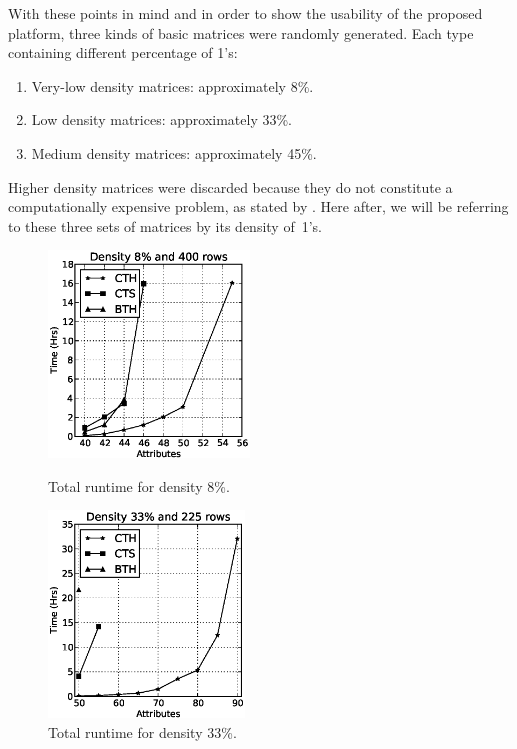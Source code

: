 \documentclass[authoryear,preprint,review,12pt]{elsarticle}
\begin{document}
With these points in mind and in order to show the usability of the proposed platform, 
three kinds of basic matrices were randomly generated. Each type containing different percentage of 1's: 
\begin{enumerate}
	\item Very-low density matrices: approximately 8\%.
	\item Low density matrices: approximately 33\%.
	\item Medium density matrices: approximately 45\%.
\end{enumerate}

Higher density matrices were discarded because they do not constitute a computationally expensive problem, 
as stated by \cite{R21}. Here after, we will be referring to these three sets of matrices by its 
density of~1's.

\begin{figure}[htb]
\centering
\begin{minipage}{.5\textwidth}
  \centering
   \includegraphics[width=\linewidth , height=5.5cm]{low_density.eps}
  \caption{Total runtime for density 8\%.}
  \label{fig:result1}
\end{minipage}%
\begin{minipage}{.5\textwidth}
  \centering
   \includegraphics[width=\linewidth , height=5.5cm]{med_density.eps}
  \caption{Total runtime for density 33\%.}
  \label{fig:result2}
\end{minipage}
\end{figure}
\end{document}
